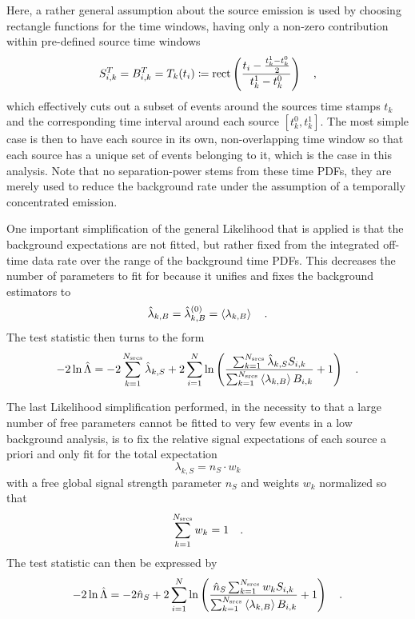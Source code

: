 Here, a rather general assumption about the source emission is used by choosing rectangle functions  for the time windows, having only a non-zero contribution within pre-defined source time windows
\begin{equation}
  S_{i,k}^T = B_{i,k}^T = T_k(t_i) \coloneqq
    \operatorname{rect}\left(\frac{t_i - \frac{t_k^1-t_k^0}{2}}
                              {t_k^1-t_k^0}\right)
  \quad\text{,}
\end{equation}
which effectively cuts out a subset of events around the sources time stamps $t_k$ and the corresponding time interval around each source $[t_k^0, t_k^1]$.
The most simple case is then to have each source in its own, non-overlapping time window so that each source has a unique set of events belonging to it, which is the case in this analysis.
Note that no separation-power stems from these time PDFs, they are merely used to reduce the background rate under the assumption of a temporally concentrated emission.

One important simplification of the general Likelihood that is applied is that the background expectations are not fitted, but rather fixed from the integrated off-time data rate over the range of the background time PDFs.
This decreases the number of parameters to fit for because it unifies and fixes the background estimators to
\begin{equation}
  \hat{\lambda}_{k,B} = \hat{\lambda}_{k,B}^{(0)} = \Braket{\lambda_{k,B}}
  \quad\text{.}
\end{equation}
The test statistic then turns to the form
\begin{equation}
  -2\ln\hat{\Lambda}
  = -2\sum_{k=1}^{N_\text{srcs}}\hat{\lambda}_{k,S} +
      2\sum_{i=1}^N \ln\left(
        \frac{\sum_{k=1}^{N_\text{srcs}}\hat{\lambda}_{k,S} S_{i,k}}
             {\sum_{k=1}^{N_\text{srcs}}\Braket{\lambda_{k,B}} B_{i,k}}
        + 1
      \right)
  \quad\text{.}
\end{equation}

The last Likelihood simplification performed, in the necessity to that a large number of free parameters cannot be fitted to very few events in a low background analysis, is to fix the relative signal expectations of each source a priori and only fit for the total expectation
\begin{equation}
  \lambda_{k,S} = n_S \cdot w_k
\end{equation}
with a free global signal strength parameter $n_S$ and weights $w_k$ normalized so that
\begin{equation}
  \sum_{k=1}^{N_\text{srcs}} w_k = 1
  \quad\text{.}
\end{equation}
The test statistic can then be expressed by
\begin{equation}
  -2\ln\hat{\Lambda}
  = -2\hat{n}_S +
      2\sum_{i=1}^N \ln\left(
        \frac{\hat{n}_S \sum_{k=1}^{N_\text{srcs}} w_k S_{i,k}}
             {\sum_{k=1}^{N_\text{srcs}}\Braket{\lambda_{k,B}} B_{i,k}}
        + 1
      \right)
  \quad\text{.}
\end{equation}

